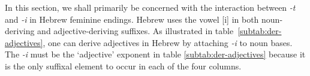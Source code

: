 In this section, we shall primarily be concerned with the
interaction between \textit{-t} and \textit{-i} in Hebrew feminine endings.
Hebrew uses the vowel [i] 
in both noun-deriving and adjective-deriving suffixes. 
As illustrated in table~\ref{subtab:der-adjectives}, 
one can derive adjectives 
in Hebrew by attaching \textit{-i} to noun bases. The \textit{-i} 
must be the `adjective' exponent
in table \ref{subtab:der-adjectives} because it is the only suffixal 
element to occur in each
of the four columns. %
\begin{table}[ht]
   \centering
   \caption{Derivational and inflectional syncretism in Hebrew feminine endings.}\label{tab:deriv} 
   \\
\vspace{6pt}
\end{table}
